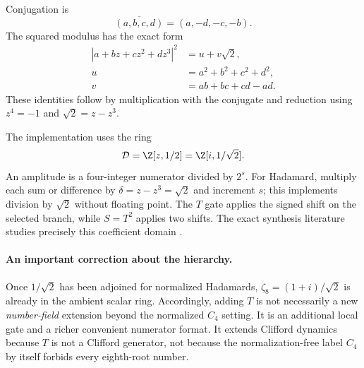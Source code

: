Conjugation is
\begin{equation}
 \overline{(a,b,c,d)}=(a,-d,-c,-b).
\end{equation}
The squared modulus has the exact form
\begin{align}\label{eq:C8norm}
 |a+bz+cz^2+dz^3|^2&=u+v\sqrt2,\\
 u&=a^2+b^2+c^2+d^2,\nonumber\\
 v&=ab+bc+cd-ad.\nonumber
\end{align}
These identities follow by multiplication with the conjugate and reduction using $z^4=-1$ and $\sqrt2=z-z^3$.

The implementation uses the ring
\begin{equation}\label{eq:ring}
 \mathcal D=\Z[z,1/2]=\Z[i,1/\sqrt2].
\end{equation}
An amplitude is a four-integer numerator divided by $2^s$. For Hadamard, multiply each sum or difference by $\delta=z-z^3=\sqrt2$ and increment $s$; this implements division by $\sqrt2$ without floating point. The $T$ gate applies the signed shift on the selected branch, while $S=T^2$ applies two shifts. The exact synthesis literature studies precisely this coefficient domain \cite{giles,kmm}.

\paragraph{An important correction about the hierarchy.}
Once $1/\sqrt2$ has been adjoined for normalized Hadamards, $\zeta_8=(1+i)/\sqrt2$ is already in the ambient scalar ring. Accordingly, adding $T$ is not necessarily a new \emph{number-field} extension beyond the normalized $C_4$ setting. It is an additional local gate and a richer convenient numerator format. It extends Clifford dynamics because $T$ is not a Clifford generator, not because the normalization-free label $C_4$ by itself forbids every eighth-root number.

